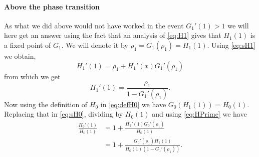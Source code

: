 \paragraph{Above the phase transition}
As what we did above would not have worked in the event $G_1'(1) > 1$ we will here get an answer using the fact that an analysis of \eqref{eq:H1} gives that $H_1(1)$ is a fixed point of $G_1$.
We will denote it by $\rho_1 = G_1(\rho_1) = H_1(1)$.
Using \eqref{eq:sH1} we obtain,
\begin{equation}
	H_1'(1) = \rho_1 + H_1'(x)G_1'(\rho_1)
\end{equation}
from which we get
\begin{equation}\label{eq:HPrime}
	H_1'(1) = \frac{\rho_1}{1 - G_1'(\rho_1)}.
\end{equation}
Now using the definition of $H_0$ in \eqref{eq:defH0} we have $G_0(H_1(1)) = H_0(1)$.
Replacing that in \eqref{eq:sH0}, dividing by $H_0(1)$ and using \eqref{eq:HPrime} we have
\begin{align}
	\frac{H_0'(1)}{H_0(1)} &= 1 + \frac{H_1'(1)G_0'(\rho_1)}{H_0(1)} \\
		&= 1 +\frac{G_0'(\rho_1)H_1(1)}{H_0(1)(1-G_1'(\rho_1))}.
\end{align}


